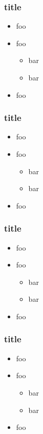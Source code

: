\documentclass[pdftex]{beamer}
\begin{document}
\begin{frame}
  \frametitle{title}
  \begin{itemize}
  \item foo
  \item foo
    \begin{itemize}
    \item bar
    \item bar
    \end{itemize}
  \item foo
  \end{itemize}
\end{frame}

\begin{frame}
  \frametitle{title}
  \begin{itemize}
  \item foo
  \item foo
    \begin{itemize}
    \item bar
    \item bar
    \end{itemize}
  \item foo
  \end{itemize}
\end{frame}

\begin{frame}
  \frametitle{title}
  \begin{itemize}
  \item foo
  \item foo
    \begin{itemize}
    \item bar
    \item bar
    \end{itemize}
  \item foo
  \end{itemize}
\end{frame}

\begin{frame}
  \frametitle{title}
  \begin{itemize}
  \item foo
  \item foo
    \begin{itemize}
    \item bar
    \item bar
    \end{itemize}
  \item foo
  \end{itemize}
\end{frame}
\end{document}
